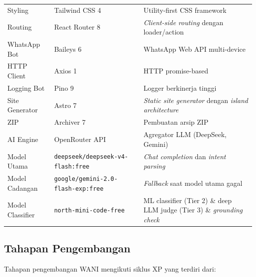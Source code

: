 \documentclass[12pt,a4paper,oneside]{article}
\newcommand{\sub}[1]{%
    \subsection{#1}%
}
\begin{document}
\begin{table}[H]
\begin{tabularx}{\textwidth}{p{2.8cm}p{3cm}X}
		Styling             & Tailwind CSS 4                           & Utility-first CSS framework                                                                  \\
		Routing             & React Router 8                           & \textit{Client-side routing} dengan loader/action                                            \\
		\addlinespace
		WhatsApp Bot        & Baileys 6                                & WhatsApp Web API multi-device                                                                \\
		HTTP Client         & Axios 1                                  & HTTP promise-based                                                                           \\
		Logging Bot         & Pino 9                                   & Logger berkinerja tinggi                                                                     \\
		\addlinespace
		Site Generator      & Astro 7                                  & \textit{Static site generator} dengan \textit{island architecture}                           \\
		ZIP                 & Archiver 7                               & Pembuatan arsip ZIP                                                                          \\
		\addlinespace
		AI Engine           & OpenRouter API                           & Agregator LLM (DeepSeek, Gemini)                                                              \\
		Model Utama         & \texttt{deepseek/deepseek-v4-flash:free} & \textit{Chat completion} dan \textit{intent parsing}                                         \\
		Model Cadangan      & \texttt{google/gemini-2.0-flash-exp:free} & \textit{Fallback} saat model utama gagal                                                     \\
		Model Classifier    & \texttt{north-mini-code-free}              & ML classifier (Tier 2) \& deep LLM judge (Tier 3) \& \textit{grounding check}                \\
		\bottomrule
	\end{tabularx}
\end{table}

\sub{Tahapan Pengembangan}

Tahapan pengembangan WANI mengikuti siklus XP yang terdiri dari:
\end{document}
